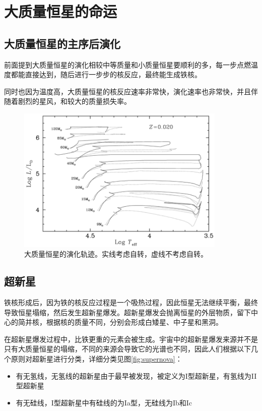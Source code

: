 \chapter{大质量恒星的命运}
\section{大质量恒星的主序后演化}
前面提到大质量恒星的演化相较中等质量和小质量恒星要顺利的多，每一步点燃温度都能直接达到，随后进行一步步的核反应，最终能生成铁核。

同时也因为温度高，大质量恒星的核反应速率非常快，演化速率也非常快，并且伴随着剧烈的星风，和较大的质量损失率。

\begin{figure}[hbt]
  \centering
  \includegraphics[width=10cm]{chapters/15/massive}
  \caption{大质量恒星的演化轨迹。实线考虑自转，虚线不考虑自转。}
  \label{}
\end{figure}

\section{超新星}
铁核形成后，因为铁的核反应过程是一个吸热过程，因此恒星无法继续平衡，最终导致恒星塌缩，然后发生超新星爆发。超新星爆发会抛离恒星的外层物质，留下中心的简并核，根据核的质量不同，分别会形成白矮星、中子星和黑洞。

在超新星爆发过程中，比铁更重的元素会被生成。宇宙中的超新星爆发来源并不是只有大质量恒星的塌缩，不同的来源会导致它的光谱也不同，因此人们根据以下几个原则对超新星进行分类，详细分类见图\ref{fig:supernova}：
\begin{itemize}
  \item 有无氢线，无氢线的超新星由于最早被发现，被定义为I型超新星，有氢线为II型超新星
  \item 有无硅线，I型超新星中有硅线的为Ia型，无硅线为Ib和Ic
\end{itemize}

